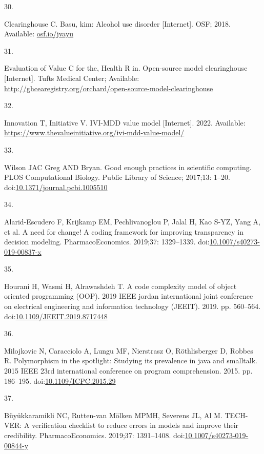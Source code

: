 \documentclass[
]{article}
\newlength{\cslhangindent}
\newlength{\csllabelwidth}
\newlength{\cslentryspacingunit} %
\newenvironment{CSLReferences}[2] %
 {%
  \setlength{\parindent}{0pt}
  \ifodd #1
  \let\oldpar\par
  \def\par{\hangindent=\cslhangindent\oldpar}
  \fi
  \setlength{\parskip}{#2\cslentryspacingunit}
 }%
 {}
\newcommand{\CSLLeftMargin}[1]{\parbox[t]{\csllabelwidth}{#1}}
\newcommand{\CSLRightInline}[1]{\parbox[t]{\linewidth - \csllabelwidth}{#1}\break}
\begin{document}
\begin{CSLReferences}{0}{0}
\leavevmode{}%
\CSLLeftMargin{30. }%
\CSLRightInline{Clearinghouse C. Basu, kim: Alcohol use disorder {[}Internet{]}. OSF; 2018. Available: \href{https://osf.io/jvayu}{osf.io/jvayu}}

\leavevmode{}%
\CSLLeftMargin{31. }%
\CSLRightInline{Evaluation of Value C for the, Health R in. Open-source model clearinghouse {[}Internet{]}. Tufts Medical Center; Available: \url{http://ghcearegistry.org/orchard/open-source-model-clearinghouse}}

\leavevmode{}%
\CSLLeftMargin{32. }%
\CSLRightInline{Innovation T, Initiative V. IVI-MDD value model {[}Internet{]}. 2022. Available: \url{https://www.thevalueinitiative.org/ivi-mdd-value-model/}}

\leavevmode{}%
\CSLLeftMargin{33. }%
\CSLRightInline{Wilson JAC Greg AND Bryan. Good enough practices in scientific computing. PLOS Computational Biology. Public Library of Science; 2017;13: 1--20. doi:\href{https://doi.org/10.1371/journal.pcbi.1005510}{10.1371/journal.pcbi.1005510}}

\leavevmode{}%
\CSLLeftMargin{34. }%
\CSLRightInline{Alarid-Escudero F, Krijkamp EM, Pechlivanoglou P, Jalal H, Kao S-YZ, Yang A, et al. A need for change! A coding framework for improving transparency in decision modeling. PharmacoEconomics. 2019;37: 1329--1339. doi:\href{https://doi.org/10.1007/s40273-019-00837-x}{10.1007/s40273-019-00837-x}}

\leavevmode{}%
\CSLLeftMargin{35. }%
\CSLRightInline{Hourani H, Wasmi H, Alrawashdeh T. A code complexity model of object oriented programming (OOP). 2019 IEEE jordan international joint conference on electrical engineering and information technology (JEEIT). 2019. pp. 560--564. doi:\href{https://doi.org/10.1109/JEEIT.2019.8717448}{10.1109/JEEIT.2019.8717448}}

\leavevmode{}%
\CSLLeftMargin{36. }%
\CSLRightInline{Milojkovic N, Caracciolo A, Lungu MF, Nierstrasz O, Röthlisberger D, Robbes R. Polymorphism in the spotlight: Studying its prevalence in java and smalltalk. 2015 IEEE 23rd international conference on program comprehension. 2015. pp. 186--195. doi:\href{https://doi.org/10.1109/ICPC.2015.29}{10.1109/ICPC.2015.29}}

\leavevmode{}%
\CSLLeftMargin{37. }%
\CSLRightInline{Büyükkaramikli NC, Rutten-van Mölken MPMH, Severens JL, Al M. TECH-VER: A verification checklist to reduce errors in models and improve their credibility. PharmacoEconomics. 2019;37: 1391--1408. doi:\href{https://doi.org/10.1007/s40273-019-00844-y}{10.1007/s40273-019-00844-y}}


\end{CSLReferences}
\end{document}
